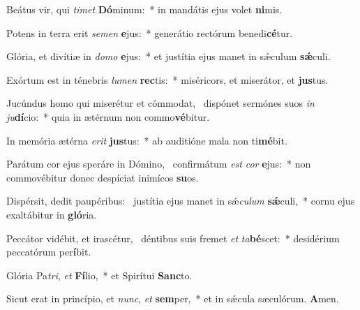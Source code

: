 \item Beátus vir, qui \textit{timet} \textbf{Dó}minum:~* in mandátis ejus volet \textbf{ni}mis.

\item Potens in terra erit \textit{semen} \textbf{e}jus:~* generátio rectórum benedi\textbf{cé}tur.

\item Glória, et divítiæ in \textit{domo} \textbf{e}jus:~* et justítia ejus manet in sǽculum \textbf{sǽ}culi.

\item Exórtum est in ténebris \textit{lumen} \textbf{rec}tis:~* miséricors, et miserátor, et \textbf{jus}tus.

\item Jucúndus homo qui miserétur et cómmodat,~\pscross{} dispónet sermónes suos \textit{in} \textit{ju}\textbf{dí}cio:~* quia in ætérnum non commo\textbf{vé}bitur.

\item In memória ætérna \textit{erit} \textbf{jus}tus:~* ab auditióne mala non ti\textbf{mé}bit.

\item Parátum cor ejus speráre in Dómino,~\pscross{} confirmátum \textit{est} \textit{cor} \textbf{e}jus:~* non commovébitur donec despíciat inimícos \textbf{su}os.

\item Dispérsit, dedit paupéribus:~\pscross{} justítia ejus manet in sǽ\textit{culum} \textbf{sǽ}culi,~* cornu ejus exaltábitur in \textbf{gló}ria.

\item Peccátor vidébit, et irascétur,~\pscross{} déntibus suis fremet \textit{et} \textit{ta}\textbf{bé}scet:~* desidérium peccatórum per\textbf{í}bit.

\item Glória Pa\textit{tri}, \textit{et} \textbf{Fí}lio,~* et Spirítui \textbf{Sanc}to.

\item Sicut erat in princípio, et \textit{nunc}, \textit{et} \textbf{sem}per,~* et in sǽcula sæculórum. \textbf{A}men.
